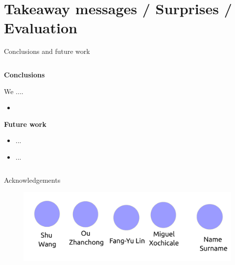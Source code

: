 \section{Takeaway messages / Surprises / Evaluation}



{
\begin{frame}{Conclusions and future work}

  \begin{columns}
  \begin{column}{.75\linewidth}

  \textbf{Conclusions}   

  We ....
  \begin{itemize}
    \item
  \end{itemize}

  \textbf{Future work}
  \begin{itemize}
    \item ...
    \item ...
  \end{itemize}

    \end{column}


  \begin{column}{.3\linewidth}

      \begin{figure}
        \centering
      \end{figure}

    \end{column}
  \end{columns}

\end{frame}
}


{
\begin{frame}{Acknowledgements}

  \begin{figure}
  \centering
  \includegraphics[width=1.0\textwidth]{./figures/team/versions/drawing-v01.png}
  \end{figure}

\end{frame}
}
